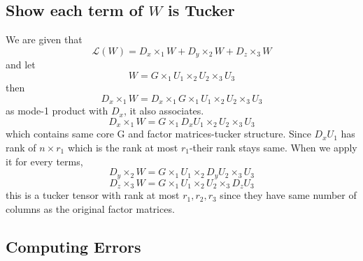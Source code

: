 \documentclass[11pt]{report}
\begin{document}
\subsection{Show each term of $W$ is Tucker}

We are given that
\[
\mathcal{L}(W) = D_x \times_1 W + D_y \times_2 W + D_z \times_3 W
\]
and let
\[
W = G \times_1 U_1 \times_2 U_2 \times_3 U_3
\]
then
\[
D_x \times_1 W = D_x \times_1 G \times_1 U_1 \times_2 U_2 \times_3 U_3
\]
as mode-1 product with $D_x$, it also associates.
\[
D_x \times_1 W = G \times_1  D_x U_1 \times_2 U_2 \times_3 U_3
\]
which contains same core G and factor matrices-tucker structure. Since $D_x U_1$ has rank of $n\times r_1$ which is the rank at most $r_1$-their rank stays same.
When we apply it for every terms,
\[
D_y \times_2 W = G \times_1  U_1 \times_2 D_y U_2 \times_3 U_3
\]
\[
D_z \times_3 W = G \times_1  U_1 \times_2 U_2 \times_3 D_z U_3
\]
this is a tucker tensor with rank at most $r_1, r_2, r_3$ since they have same number of columns as the original factor matrices.

\subsection{Computing Errors}
\end{document}
